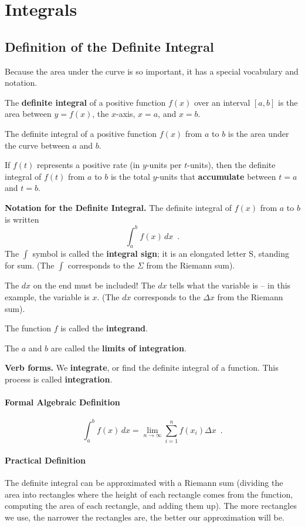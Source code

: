 \section{Integrals}
\label{sec:integrals}
\subsection{Definition of the Definite Integral}
Because the area under the curve is so important, it has a special vocabulary and notation.

\begin{definition}
The {\bf definite integral} of a positive function $f(x)$ over an interval $[a,b]$ is the area between $y=f(x)$, the $x$-axis, $x=a$, and $x=b$.

The definite integral of a positive function $f(x)$ from $a$ to $b$ is the area under the curve between $a$ and $b$.

If $f(t)$ represents a positive rate (in $y$-units per $t$-units), then the definite integral of $f(t)$ from $a$ to $b$ is the total $y$-units that {\bf accumulate} between $t=a$ and $t=b$.

{\bf Notation for the Definite Integral.} The definite integral of $f(x)$ from $a$ to $b$ is written
$$\int_a^b f(x)\,dx \enspace .$$
The $\int$ symbol is called the {\bf integral sign}; it is an elongated letter S, standing for sum. (The $\int$ corresponds to the $\Sigma$ from the Riemann sum).

The $dx$ on the end must be included! The $dx$ tells what the variable is – in this example, the variable is $x$. (The $dx$ corresponds to the $\Delta x$ from the Riemann sum).

The function $f$ is called the {\bf integrand}.

The $a$ and $b$ are called the {\bf limits of integration}.

{\bf Verb forms.} We {\bf integrate}, or find the definite integral of a function. This process is called {\bf integration}.

\paragraph{Formal Algebraic Definition}
$$\int_a^b f(x)\,dx = \lim_{n\to\infty} \sum_{i=1}^n f(x_i)\Delta x \enspace .$$
\paragraph{Practical Definition}
The definite integral can be approximated with a Riemann sum (dividing the area into rectangles where the height of each rectangle comes from the function, computing the area of each rectangle, and adding them up). The more rectangles we use, the narrower the rectangles are, the better our approximation will be.


\end{definition}
